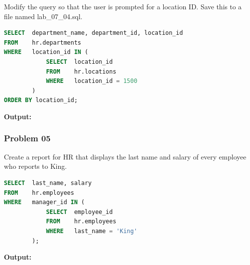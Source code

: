 \vspace{5cm}
Modify the query so that the user is prompted for a location ID. Save this to a file named lab\_07\_04.sql.

\begin{frame}



\begin{lstlisting}[language=SQL]
SELECT 	department_name, department_id, location_id
FROM 	hr.departments
WHERE 	location_id IN (
   			SELECT 	location_id
   			FROM 	hr.locations
   			WHERE 	location_id = 1500
		)
ORDER BY location_id;
\end{lstlisting}
\textbf{Output: }
\end{frame}



\newpage
\subsubsection*{Problem 05}
Create a report for HR that displays the last name and salary of every employee who reports to King.
\begin{frame}



\begin{lstlisting}[language=SQL]
SELECT 	last_name, salary
FROM 	hr.employees
WHERE 	manager_id IN (
   			SELECT 	employee_id
   			FROM 	hr.employees
   			WHERE 	last_name = 'King'
		);
\end{lstlisting}
\textbf{Output: }
\end{frame}



